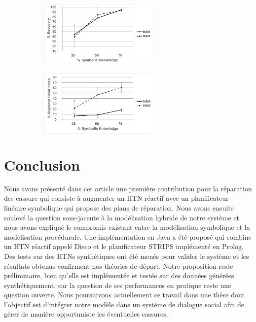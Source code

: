 \documentclass[a4paper,twoside,french]{article}
\begin{document}
		\begin{figure}[t]
			\centering
			\begin{subfigure}{2.3in}
				\centerline{\includegraphics[width=2.3in]{figs/recovery}}
				\vskip 8pt 
			\end{subfigure}
			\hfill
			\begin{subfigure}{2.3in}
				\centerline{\includegraphics[width=2.3in]{figs/candidates}}
				\vskip 8pt 
			\end{subfigure}
			\vskip 6pt
		\end{figure}
\section{Conclusion}
Nous avons présenté dans cet article une première contribution pour la réparation des cassure qui consiste à augmenter un HTN réactif avec un planificateur linéaire symbolique qui propose des plans de réparation. Nous avons ensuite soulevé la question sous-jacente à la modélisation hybride de notre système et nous avons expliqué le compromis existant entre la modélisation symbolique et la modélisation procédurale. Une implémentation en Java a été proposé qui combine un HTN réactif appelé Disco et le planificateur STRIPS implémenté en Prolog. Des tests sur des HTNs synthétiques ont été menés pour valider le système et les résultats obtenus confirment nos théories de départ. Notre proposition reste préliminaire, bien qu'elle est implémentée et testée sur des données générées synthétiquement, car la question de ses performances en pratique reste une question ouverte. Nous poursuivons actuellement ce travail dans une thèse dont l'objectif est d'intégrer notre modèle dans un système de dialogue social afin de gérer de manière opportuniste les éventuelles cassures.
		\vskip 4pt
		
		{\footnotesize
				} %
							
				
\end{document}
